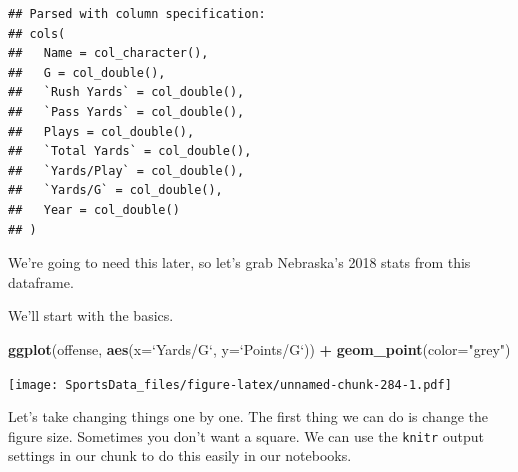 \documentclass[
]{book}
\newenvironment{Shaded}{\begin{snugshade}}{\end{snugshade}}
\newcommand{\DataTypeTok}[1]{\textcolor[rgb]{0.13,0.29,0.53}{#1}}
\newcommand{\DecValTok}[1]{\textcolor[rgb]{0.00,0.00,0.81}{#1}}
\newcommand{\KeywordTok}[1]{\textcolor[rgb]{0.13,0.29,0.53}{\textbf{#1}}}
\newcommand{\NormalTok}[1]{#1}
\newcommand{\OperatorTok}[1]{\textcolor[rgb]{0.81,0.36,0.00}{\textbf{#1}}}
\newcommand{\StringTok}[1]{\textcolor[rgb]{0.31,0.60,0.02}{#1}}
\begin{document}
\begin{verbatim}
## Parsed with column specification:
## cols(
##   Name = col_character(),
##   G = col_double(),
##   `Rush Yards` = col_double(),
##   `Pass Yards` = col_double(),
##   Plays = col_double(),
##   `Total Yards` = col_double(),
##   `Yards/Play` = col_double(),
##   `Yards/G` = col_double(),
##   Year = col_double()
## )
\end{verbatim}

\begin{Shaded}
\end{Shaded}

We're going to need this later, so let's grab Nebraska's 2018 stats from this dataframe.

\begin{Shaded}
\end{Shaded}

We'll start with the basics.

\begin{Shaded}
\begin{Highlighting}[]
\KeywordTok{ggplot}\NormalTok{(offense, }\KeywordTok{aes}\NormalTok{(}\DataTypeTok{x=}\StringTok{`}\DataTypeTok{Yards/G}\StringTok{`}\NormalTok{, }\DataTypeTok{y=}\StringTok{`}\DataTypeTok{Points/G}\StringTok{`}\NormalTok{)) }\OperatorTok{+}\StringTok{ }
\StringTok{  }\KeywordTok{geom_point}\NormalTok{(}\DataTypeTok{color=}\StringTok{"grey"}\NormalTok{)}
\end{Highlighting}
\end{Shaded}

\texttt{[image: SportsData\_files/figure-latex/unnamed-chunk-284-1.pdf]}

Let's take changing things one by one. The first thing we can do is change the figure size. Sometimes you don't want a square. We can use the \texttt{knitr} output settings in our chunk to do this easily in our notebooks.
\end{document}
